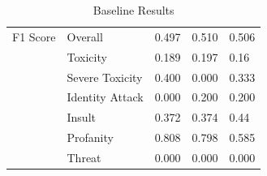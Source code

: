 \documentclass[11pt]{article}
\begin{document}
\begin{table}[h]
\begin{tabular}{lllll}
\multicolumn{1}{l|}{F1 Score}        & \multicolumn{1}{l|}{Overall}           & 0.497 & 0.510   & 0.506 \\ \cline{2-5} 
\multicolumn{1}{l|}{}                & \multicolumn{1}{l|}{Toxicity}          & 0.189 & 0.197   & 0.16  \\ \cline{2-5} 
\multicolumn{1}{l|}{}                & \multicolumn{1}{l|}{Severe Toxicity}   & 0.400 & 0.000   & 0.333 \\ \cline{2-5} 
\multicolumn{1}{l|}{}                & \multicolumn{1}{l|}{Identity Attack}   & 0.000 & 0.200   & 0.200 \\ \cline{2-5} 
\multicolumn{1}{l|}{}                & \multicolumn{1}{l|}{Insult}            & 0.372 & 0.374   & 0.44  \\ \cline{2-5} 
\multicolumn{1}{l|}{}                & \multicolumn{1}{l|}{Profanity}         & 0.808 & 0.798   & 0.585 \\ \cline{2-5} 
\multicolumn{1}{l|}{}                & \multicolumn{1}{l|}{Threat}            & 0.000 & 0.000   & 0.000 \\ \hline
\end{tabular}
\caption{\label{baseline-results}
Baseline Results  }
\end{table}
\end{document}
